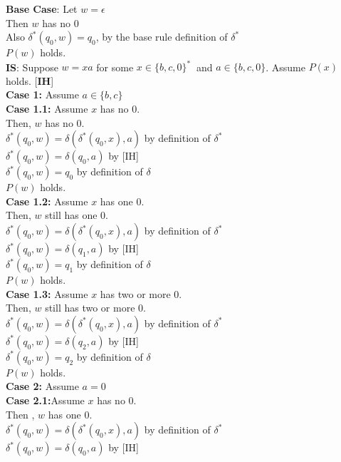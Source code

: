 \documentclass{article}
\begin{document}
\begin{enumerate}
    \textbf{Base Case}: Let $w=\epsilon$\\
    Then $w$ has no 0\\
    Also $\delta^\ast(q_0, w) = q_0$, by the base rule definition of $\delta^\ast$\\
    $P(w)$ holds.\\
    \textbf{IS}: Suppose $w=xa$ for some $x \in \{b,c,0\}^\ast\ $ and $a \in \{b,c,0\}$. Assume $P(x)$ holds. [\textbf{IH}]\\
    \textbf{Case 1:} Assume $a \in \{b,c\}$\\
    \textbf{Case 1.1:} Assume $x$ has no 0.\\
    Then, $w$ has no 0.\\
    $\delta^\ast(q_0, w) = \delta(\delta^\ast(q_0, x), a)$ by definition of $\delta^\ast$\\
    $\delta^\ast(q_0, w) = \delta(q_0, a)$ by [IH]\\
    $\delta^\ast(q_0, w) = q_0$ by definition of $\delta$\\
    $P(w)$ holds.\\
    \textbf{Case 1.2:} Assume $x$ has one 0.\\
    Then, $w$ still has one 0.\\
    $\delta^\ast(q_0, w) = \delta(\delta^\ast(q_0, x), a)$ by definition of $\delta^\ast$\\
    $\delta^\ast(q_0, w) = \delta(q_1, a)$ by [IH]\\
    $\delta^\ast(q_0, w) = q_1$ by definition of $\delta$\\
    $P(w)$ holds.\\
    \textbf{Case 1.3:} Assume $x$ has two or more 0.\\
    Then, $w$ still has two or more 0.\\
    $\delta^\ast(q_0, w) = \delta(\delta^\ast(q_0, x), a)$ by definition of $\delta^\ast$\\
    $\delta^\ast(q_0, w) = \delta(q_2, a)$ by [IH]\\
    $\delta^\ast(q_0, w) = q_2$ by definition of $\delta$\\
    $P(w)$ holds.\\
    \textbf{Case 2:} Assume $a = 0 $\\
    \textbf{Case 2.1:}Assume $x$ has no 0.\\
    Then , $w$ has one 0.\\
    $\delta^\ast(q_0, w) = \delta(\delta^\ast(q_0, x), a)$ by definition of $\delta^\ast$\\
    $\delta^\ast(q_0, w) = \delta(q_0, a)$ by [IH]\\

\end{enumerate}
\end{document}
